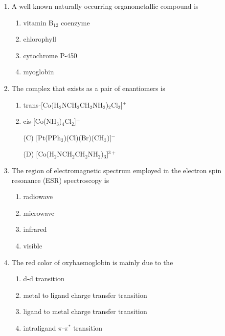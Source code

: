 \documentclass[journal,12pt,onecolumn]{IEEEtran}
\theoremstyle{remark}
\begin{document}
\begin{enumerate}
\item    A well known naturally occurring organometallic compound is \hfill{}
 

\begin{multicols}{2}
\begin{enumerate}
\item vitamin B$_{12}$ coenzyme  
\item chlorophyll  
\item cytochrome P-450  
\item myoglobin  
\end{enumerate}
\end{multicols}
 

\item    The complex that exists as a pair of enantiomers is \hfill{}
 

\begin{multicols}{2}
\begin{enumerate}
\item trans-[Co(H$_2$NCH$_2$CH$_2$NH$_2$)$_2$Cl$_2$]$^+$  
\item cis-[Co(NH$_3$)$_4$Cl$_2$]$^+$  
\item[(C)] [Pt(PPh$_3$)(Cl)(Br)(CH$_3$)]$^-$  
\item[(D)] [Co(H$_2$NCH$_2$CH$_2$NH$_2$)$_3$]$^{3+}$  
\end{enumerate}
\end{multicols}
 

\item    The region of electromagnetic spectrum employed in the electron spin resonance (ESR) spectroscopy is \hfill{}
 

\begin{multicols}{2}
\begin{enumerate}
\item radiowave  
\item microwave  
\item infrared  
\item visible  
\end{enumerate}
\end{multicols}
 

\item    The red color of oxyhaemoglobin is mainly due to the \hfill{}
 

\begin{multicols}{2}
\begin{enumerate}
\item d-d transition  
\item metal to ligand charge transfer transition  
\item ligand to metal charge transfer transition  
\item intraligand $\pi$-$\pi^*$ transition  
\end{enumerate}
\end{multicols}
 


\end{enumerate}
\end{document}
